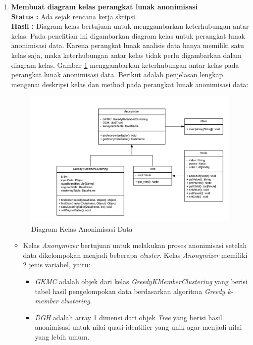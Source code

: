 \documentclass[a4paper,twoside]{article}
\begin{document}
\begin{enumerate}
\item \textbf{Membuat diagram kelas perangkat lunak anonimisasi}\\
		{\bf Status :} Ada sejak rencana kerja skripsi.\\
		{\bf Hasil :} Diagram kelas bertujuan untuk menggambarkan keterhubungan antar kelas. Pada penelitian ini digambarkan diagram kelas untuk perangkat lunak anonimisasi data. Karena perangkat lunak analisis data hanya memiliki satu kelas saja, maka keterhubungan antar kelas tidak perlu digambarkan dalam diagram kelas. Gambar \ref{fig:diagram_kelas} menggambarkan keterhubungan antar kelas pada perangkat lunak anonimisasi data. Berikut adalah penjelasan lengkap mengenai deskripsi kelas dan method pada perangkat lunak anonimisasi data:
		
\begin{figure}[H]
	\centering
	\includegraphics[scale=0.7]{diagram_kelas}
	\caption{Diagram Kelas Anonimisasi Data}
	\label{fig:diagram_kelas}
\end{figure}

\begin{itemize}
\item Kelas \textit{Anonymizer} bertujuan untuk melakukan proses anonimisasi setelah data dikelompokan menjadi beberapa \textit{cluster}. Kelas \textit{Anonymizer} memiliki 2 jenis variabel, yaitu:

\begin{itemize}

\item \textit{GKMC} adalah objek dari kelas \textit{GreedyKMemberClustering} yang berisi tabel hasil pengelompokan data berdasarkan algoritma \textit{Greedy k-member clustering}.

\item \textit{DGH} adalah array 1 dimensi dari objek \textit{Tree} yang berisi hasil anonimisasi untuk nilai quasi-identifier yang unik agar menjadi nilai yang lebih umum.


\end{itemize}
\end{itemize}
\end{enumerate}
\end{document}
